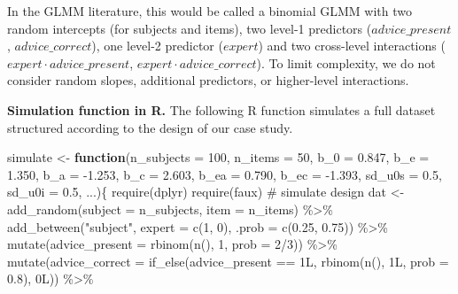 \documentclass[
  man,
  floatsintext,
  longtable,
  a4paper,
  nolmodern,
  notxfonts,
  notimes,
  colorlinks=true,linkcolor=blue,citecolor=blue,urlcolor=blue]{apa7}
\newenvironment{Shaded}{\begin{snugshade}}{\end{snugshade}}
\newcommand{\AttributeTok}[1]{\textcolor[rgb]{0.40,0.45,0.13}{#1}}
\newcommand{\CommentTok}[1]{\textcolor[rgb]{0.37,0.37,0.37}{#1}}
\newcommand{\ControlFlowTok}[1]{\textcolor[rgb]{0.00,0.23,0.31}{\textbf{#1}}}
\newcommand{\DecValTok}[1]{\textcolor[rgb]{0.68,0.00,0.00}{#1}}
\newcommand{\FloatTok}[1]{\textcolor[rgb]{0.68,0.00,0.00}{#1}}
\newcommand{\FunctionTok}[1]{\textcolor[rgb]{0.28,0.35,0.67}{#1}}
\newcommand{\NormalTok}[1]{\textcolor[rgb]{0.00,0.23,0.31}{#1}}
\newcommand{\OtherTok}[1]{\textcolor[rgb]{0.00,0.23,0.31}{#1}}
\newcommand{\SpecialCharTok}[1]{\textcolor[rgb]{0.37,0.37,0.37}{#1}}
\newcommand{\StringTok}[1]{\textcolor[rgb]{0.13,0.47,0.30}{#1}}
\begin{document}
In the GLMM literature, this would be called a binomial GLMM with two
random intercepts (for subjects and items), two level-1 predictors
(\(advice\_present\), \(advice\_correct\)), one level-2 predictor
(\(expert\)) and two cross-level interactions
(\(expert \cdot advice\_present\), \(expert \cdot advice\_correct\)). To
limit complexity, we do not consider random slopes, additional
predictors, or higher-level interactions.

\textbf{Simulation function in R.} The following R function simulates a
full dataset structured according to the design of our case study.

\begin{Shaded}
\begin{Highlighting}[]
\NormalTok{simulate }\OtherTok{\textless{}{-}} \ControlFlowTok{function}\NormalTok{(}\AttributeTok{n\_subjects =} \DecValTok{100}\NormalTok{, }\AttributeTok{n\_items =} \DecValTok{50}\NormalTok{,}
  \AttributeTok{b\_0 =} \FloatTok{0.847}\NormalTok{, }\AttributeTok{b\_e =} \FloatTok{1.350}\NormalTok{, }\AttributeTok{b\_a =} \SpecialCharTok{{-}}\FloatTok{1.253}\NormalTok{, }\AttributeTok{b\_c =} \FloatTok{2.603}\NormalTok{,}
  \AttributeTok{b\_ea =} \FloatTok{0.790}\NormalTok{, }\AttributeTok{b\_ec =} \SpecialCharTok{{-}}\FloatTok{1.393}\NormalTok{,}
  \AttributeTok{sd\_u0s =} \FloatTok{0.5}\NormalTok{, }\AttributeTok{sd\_u0i =} \FloatTok{0.5}\NormalTok{, ...)\{}
  \FunctionTok{require}\NormalTok{(dplyr)}
  \FunctionTok{require}\NormalTok{(faux)}
  \CommentTok{\# simulate design}
\NormalTok{  dat }\OtherTok{\textless{}{-}} \FunctionTok{add\_random}\NormalTok{(}\AttributeTok{subject =}\NormalTok{ n\_subjects, }\AttributeTok{item =}\NormalTok{ n\_items) }\SpecialCharTok{\%\textgreater{}\%}
    \FunctionTok{add\_between}\NormalTok{(}\StringTok{"subject"}\NormalTok{, }\AttributeTok{expert =} \FunctionTok{c}\NormalTok{(}\DecValTok{1}\NormalTok{, }\DecValTok{0}\NormalTok{), }\AttributeTok{.prob =} \FunctionTok{c}\NormalTok{(}\FloatTok{0.25}\NormalTok{, }\FloatTok{0.75}\NormalTok{)) }\SpecialCharTok{\%\textgreater{}\%}
    \FunctionTok{mutate}\NormalTok{(}\AttributeTok{advice\_present =} \FunctionTok{rbinom}\NormalTok{(}\FunctionTok{n}\NormalTok{(), }\DecValTok{1}\NormalTok{, }\AttributeTok{prob =} \DecValTok{2}\SpecialCharTok{/}\DecValTok{3}\NormalTok{)) }\SpecialCharTok{\%\textgreater{}\%}
    \FunctionTok{mutate}\NormalTok{(}\AttributeTok{advice\_correct =} \FunctionTok{if\_else}\NormalTok{(advice\_present }\SpecialCharTok{==} \DecValTok{1}\NormalTok{L, }
                                    \FunctionTok{rbinom}\NormalTok{(}\FunctionTok{n}\NormalTok{(), }\DecValTok{1}\NormalTok{L, }\AttributeTok{prob =} \FloatTok{0.8}\NormalTok{), }\DecValTok{0}\NormalTok{L)) }\SpecialCharTok{\%\textgreater{}\%}

\end{Highlighting}
\end{Shaded}
\end{document}

